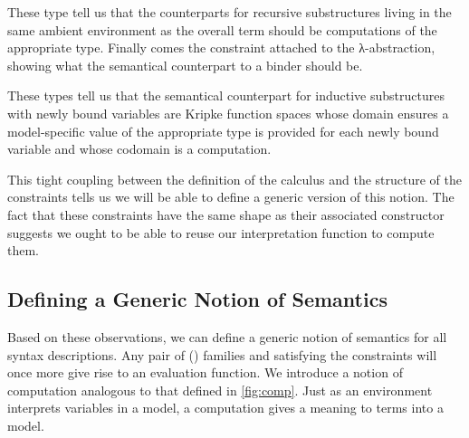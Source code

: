 \noindent\begin{minipage}[t]{0.4\textwidth}
\end{minipage}\begin{minipage}[t]{0.6\textwidth}
  \begin{AgdaSuppressSpace}
  \end{AgdaSuppressSpace}
\end{minipage}

These type tell us that the counterparts for recursive
substructures living in the same ambient environment as
the overall term should be computations of the appropriate
type.
%
Finally comes the constraint attached to the λ-abstraction,
showing what the semantical counterpart to a binder should be.

\noindent\begin{minipage}[t]{0.4\textwidth}
\end{minipage}\begin{minipage}[t]{0.6\textwidth}
\end{minipage}

These types tell us that the semantical counterpart for inductive
substructures with newly bound variables are Kripke function spaces
whose domain ensures a model-specific value  of the appropriate
type is provided for each newly bound variable and whose codomain is
a computation.

This tight coupling between the definition of the calculus and the
structure of the  constraints tells us we will be able
to define a generic version of this notion. The fact that these
constraints have the same shape as their associated constructor
suggests we ought to be able to reuse our interpretation function
 to compute them.

\subsection{Defining a Generic Notion of Semantics}

Based on these observations, we can define a generic notion of semantics
for all syntax descriptions. Any pair of {()} families
 and  satisfying the  constraints will once
more give rise to an evaluation function. We introduce a notion of
computation  analogous to that defined in \cref{fig:comp}.
Just as an environment interprets variables in a model, a computation
gives a meaning to terms into a model.


